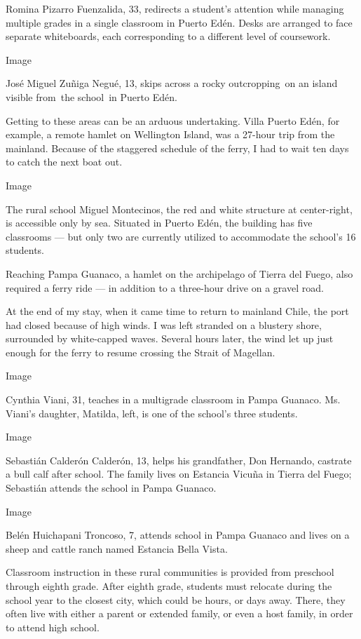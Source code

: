 Romina Pizarro Fuenzalida, 33, redirects a student's attention while
managing multiple grades in a single classroom in Puerto Edén. Desks are
arranged to face separate whiteboards, each corresponding to a different
level of coursework.

Image

José Miguel Zuñiga Negué, 13, skips across a rocky outcropping~on an
island visible from~the school~in Puerto Edén.

Getting to these areas can be an arduous undertaking. Villa Puerto Edén,
for example, a remote hamlet on Wellington Island, was a 27-hour trip
from the mainland. Because of the staggered schedule of the ferry, I had
to wait ten days to catch the next boat out.

Image

The rural school Miguel Montecinos, the red and white structure at
center-right, is accessible only by sea. Situated in Puerto Edén, the
building has five classrooms --- but only two are currently utilized to
accommodate the school's 16 students.

Reaching Pampa Guanaco, a hamlet on the archipelago of Tierra del Fuego,
also required a ferry ride --- in addition to a three-hour drive on a
gravel road.

At the end of my stay, when it came time to return to mainland Chile,
the port had closed because of high winds. I was left stranded on a
blustery shore, surrounded by white-capped waves. Several hours later,
the wind let up just enough for the ferry to resume crossing the Strait
of Magellan.

Image

Cynthia Viani, 31, teaches in a multigrade classroom in Pampa Guanaco.
Ms. Viani's daughter, Matilda, left, is one of the school's three
students.

Image

Sebastián Calderón Calderón, 13, helps his grandfather, Don Hernando,
castrate a bull calf after school. The family lives on Estancia Vicuña
in Tierra del Fuego; Sebastián attends the school in Pampa Guanaco.

Image

Belén Huichapani Troncoso, 7, attends school in Pampa Guanaco and lives
on a sheep and cattle ranch named Estancia Bella Vista.

Classroom instruction in these rural communities is provided from
preschool through eighth grade. After eighth grade, students must
relocate during the school year to the closest city, which could be
hours, or days away. There, they often live with either a parent or
extended family, or even a host family, in order to attend high school.

